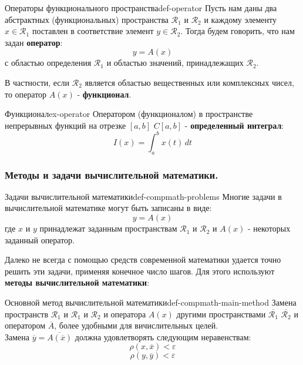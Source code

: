 \documentclass[14pt]{extarticle}
\begin{document}
        \begin{definition}{Операторы функционального пространства}{def-operator}
            Пусть нам даны два абстрактных (функциональных) пространства $\mathscr{R}_{1}$ и $\mathscr{R}_{2}$ и каждому элементу $x \in \mathscr{R}_{1}$ поставлен в соответствие элемент $y \in \mathscr{R}_{2}$. Тогда будем говорить, что нам задан \textbf{оператор}:
            $$y = A(x)$$
            с областью определения $\mathscr{R}_{1}$ и областью значений, принадлежащих $\mathscr{R}_{2}$.

            \vspace{\baselineskip}

            В частности, если $\mathscr{R}_{2}$ является областью вещественных или комплексных чисел, то оператор $A(x)$ - \textbf{функционал}.
        \end{definition}

        \begin{example}{Функционал}{ex-operator}
            Оператором (функционалом) в пространстве непрерывных функций на отрезке $[a, b]$ $C[a, b]$ - \textbf{определенный интеграл}:
            $$I(x) = \int_{a}^{b} x(t) \, dt$$
        \end{example}

    \subsubsection{Методы и задачи вычислительной математики.}

        \begin{definition}{Задачи вычислительной математики}{def-compmath-problems}
            Многие задачи в вычислительной математике могут быть записаны в виде:
            $$y = A(x)$$
            где $x$ и $y$ принадлежат заданным пространствам $\mathscr{R}_{1}$ и $\mathscr{R}_{2}$ и $A(x)$ - некоторых заданный оператор.
        \end{definition}

        Далеко не всегда с помощью средств современной математики удается точно решить эти задачи, применяя конечное число шагов. Для этого используют \textbf{методы вычислительной математики}:

        \begin{definition}{Основной метод вычислительной математики}{def-compmath-main-method}
            Замена пространств $\mathscr{R}_{1}$ и $\mathscr{R}_{1}$ и $\mathscr{R}_{2}$ и оператора $A(x)$ другими пространствами $\overline{\mathscr{R}_{1}}$ $\overline{\mathscr{R}_{2}}$ и оператором $\overline{A}$, более удобными для вичислительных целей.\\
            Замена $\overline{y} = \overline{A(\overline{x})}$ должна удовлетворять следующим неравенствам:
            $$\rho(x, \overline{x}) < \varepsilon$$
            $$\rho(y, \overline{y}) < \varepsilon$$
        \end{definition}
\end{document}
